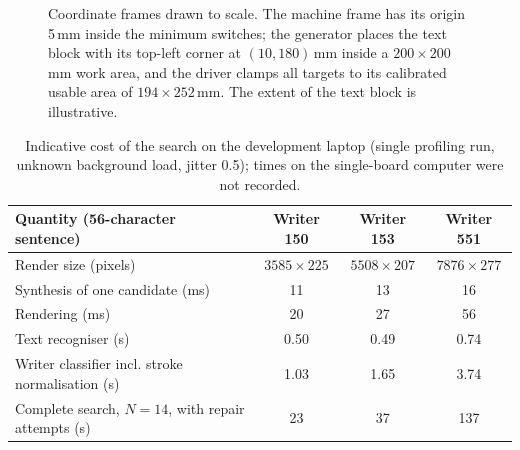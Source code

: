 \begin{figure}[h]
\centering
{}
\caption{Coordinate frames drawn to scale. The machine frame has its origin 5\,mm inside the minimum switches; the generator places the text block with its top-left corner at $(10,180)$\,mm inside a $200\times200$\,mm work area, and the driver clamps all targets to its calibrated usable area of $194\times252$\,mm. The extent of the text block is illustrative.}
\label{fig:gc-frames}
\end{figure}

\begin{table}[h]
\centering
\fontsize{9.5}{11.5}\selectfont
\begin{tabularx}{\linewidth}{|X|c|c|c|}
\hline
\textbf{Quantity (56-character sentence)} & \textbf{Writer 150} & \textbf{Writer 153} & \textbf{Writer 551} \\
\hline
Render size (pixels) & $3585\times225$ & $5508\times207$ & $7876\times277$ \\
\hline
Synthesis of one candidate (ms) & 11 & 13 & 16 \\
\hline
Rendering (ms) & 20 & 27 & 56 \\
\hline
Text recogniser (s) & 0.50 & 0.49 & 0.74 \\
\hline
Writer classifier incl. stroke normalisation (s) & 1.03 & 1.65 & 3.74 \\
\hline
Complete search, $N=14$, with repair attempts (s) & 23 & 37 & 137 \\
\hline
\end{tabularx}
\caption{Indicative cost of the search on the development laptop (single profiling run, unknown background load, jitter 0.5); times on the single-board computer were not recorded.}
\label{tab:syn-cost}
\end{table}

